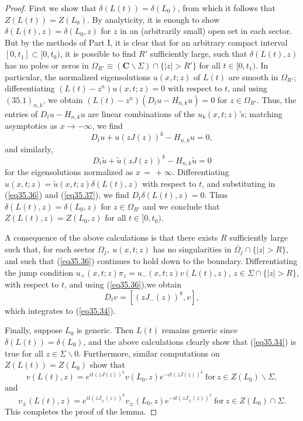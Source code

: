 \documentclass{surv-l}
\theoremstyle{plain}
\theoremstyle{definition}
\numberwithin{equation}{chapter}
\begin{document}
\begin{proof}
First we show that $\delta(L(t))=\delta(L_{0})$, from which it follows that $Z(L(t))=Z(L_{0})$. By analyticity, it is enough to show $\delta(L(t), z)=\delta(L_{0}, z)$ for $z$ in an (arbitrarily small) open set in each sector. But by the methods of Part I, it is clear that for an arbitrary compact interval $[0, t_{1}]\subset[0, t_{0})$, it is possible to find $R'$ sufficiently large, such that $\delta(L(t),z)$ has no poles or zeros in $\Omega_{R'}\equiv (\mathbf{C}\backslash \Sigma)\cap\{|z|>R'\}$ for all $t\in[0, t_{1})$. In particular, the normalized eigensolutions $u(x, t; z)$ of $L(t)$ are smooth in $\Omega_{R'}$; differentiating $(L(t)-z^{n})u(x, t;z)=0$ with respect to $t$, and using $(35.1)_{n,k}$, we obtain $(L(t)-z^{n})(D_{t}u-H_{n,k}u)=0$ for $z\in\Omega_{R'}$. Thus, the entries of $D_{t}u-H_{n,k}u$ are linear combinations of the $u_{k}(x,t; z)$'s; matching asymptotics as $ x\rightarrow-\infty$, we find
\begin{equation}\label{eq35.36}
D_{t}u+u(zJ(z))^{k}-H_{n,k}u=0,
\end{equation}
and similarly,
\begin{equation}\label{eq35.37}
D_{t}\tilde{u}+\tilde{u}(zJ(z))^{k}-H_{n,k}\tilde{u}=0
\end{equation}
for the eigensolutions normalized as $ x\,=\,+\infty$. Differentiating $u(x, t; z) =
\tilde{u}(x, t; z)\delta(L(t), z)$ with respect to $t$, and substituting in (\ref{eq35.36}) and (\ref{eq35.37}), we find $D_{t}\delta(L(t),z)=0$. Thus $\delta(L(t), z)=\delta(L_{0}, z)$ for $z\in\Omega_{R'}$ and we conclude that $Z(L(t), z)=Z(L_{0}, z)$ for all $t\in[0,t_{0})$.

A consequence of the above calculations is that there exists $R$ sufficiently large such that, for each sector $\Omega_{j},\ u(x, t;z)$ has no singularities in $\overline{\Omega}_{j}\cap\{|z|>R\}$, and such that (\ref{eq35.36}) continues to hold down to the boundary. Differentiating the jump condition $u_{+}(x, t;z)\pi_{z}=u_{-}(x, t; z)v(L(t), z)$, $z\in\Sigma\cap\{|z|>R\}$, with respect to $t$, and using (\ref{eq35.36}),we obtain
\begin{equation*}
D_{t}v=[(zJ_{-}(z))^{k}, v],
\end{equation*}
which integrates to (\ref{eq35.34}).

Finally, suppose $L_{0}$ is generic. Then $L(t)$ remains generic since $\delta(L(t))= \delta(L_{0})$, and the above calculations clearly show that (\ref{eq35.34}) is true for all $z\in\Sigma\backslash 0$. Furthermore, similar computations on $Z(L(t))=Z(L_{0})$ show that
\begin{equation*}
v(L(t),z)=e^{it(zJ(z))^{k}}v(L_{0}, z)e^{-it(zJ(z))^{k}}\ \mathrm{for}\ z\in Z(L_{0})\backslash \Sigma,
\end{equation*}
and
\begin{equation*}
v_{\pm}(L(t),z)=e^{it(zJ_{\pm}(z))^{k}}v_{\pm}(L_{0},z)e^{-it(zJ_{\pm}(z))^{k}}\ \mathrm{for}\  z\in Z(L_{0})\cap\Sigma.
\end{equation*}
This completes the proof of the lemma.\quad
\end{proof}
\end{document}
